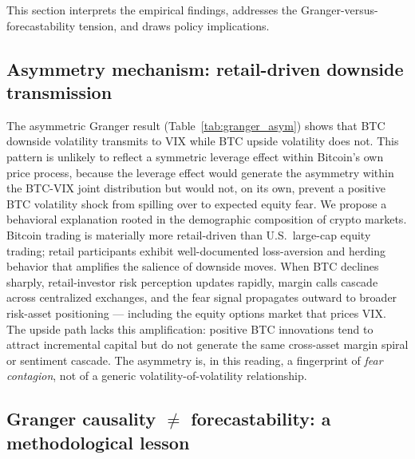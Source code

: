 \documentclass[11pt,a4paper]{article}
\begin{document}
This section interprets the empirical findings, addresses the Granger-versus-forecastability tension, and draws policy implications.

\subsection{Asymmetry mechanism: retail-driven downside transmission}
\label{subsec:d_asym}

The asymmetric Granger result (Table~\ref{tab:granger_asym}) shows that BTC downside volatility transmits to VIX while BTC upside volatility does not. This pattern is unlikely to reflect a symmetric leverage effect within Bitcoin's own price process, because the leverage effect would generate the asymmetry within the BTC-VIX joint distribution but would not, on its own, prevent a positive BTC volatility shock from spilling over to expected equity fear. We propose a behavioral explanation rooted in the demographic composition of crypto markets. Bitcoin trading is materially more retail-driven than U.S.\ large-cap equity trading; retail participants exhibit well-documented loss-aversion and herding behavior that amplifies the salience of downside moves. When BTC declines sharply, retail-investor risk perception updates rapidly, margin calls cascade across centralized exchanges, and the fear signal propagates outward to broader risk-asset positioning --- including the equity options market that prices VIX. The upside path lacks this amplification: positive BTC innovations tend to attract incremental capital but do not generate the same cross-asset margin spiral or sentiment cascade. The asymmetry is, in this reading, a fingerprint of \emph{fear contagion}, not of a generic volatility-of-volatility relationship.

\subsection{Granger causality $\ne$ forecastability: a methodological lesson}
\label{subsec:d_gc_vs_fc}
\end{document}
